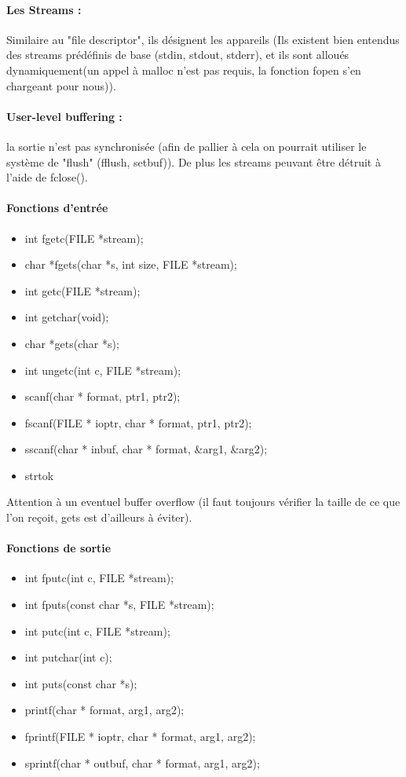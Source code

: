 \documentclass{article}[12pt]
\begin{document}
\paragraph{Les Streams : }
Similaire au "file descriptor", ils désignent les appareils (Ils existent bien entendus des streams prédéfinis de base (stdin, stdout, stderr), et ils sont alloués dynamiquement(un appel à malloc n'est pas requis, la fonction fopen s'en chargeant pour nous)).
\paragraph{User-level buffering : } la sortie n'est pas synchronisée (afin de pallier à cela on pourrait utiliser le système de "flush" (fflush, setbuf)). De plus les streams peuvant être détruit à l'aide de fclose().
\paragraph{Fonctions d'entrée}
\begin{itemize}
	\item int fgetc(FILE *stream);
	\item char *fgets(char *s, int size, FILE *stream);
	\item int getc(FILE *stream);
	\item int getchar(void);
	\item char *gets(char *s);
	\item int ungetc(int c, FILE *stream);
	\item scanf(char * format, ptr1, ptr2);
	\item fscanf(FILE * ioptr, char * format, ptr1, ptr2);
	\item sscanf(char * inbuf, char * format, \&arg1, \&arg2);
	\item strtok 
\end{itemize}   
Attention à un eventuel buffer overflow (il faut toujours vérifier la taille de ce que l'on reçoit, gets est d'ailleurs à éviter).
\paragraph{Fonctions de sortie}
\begin{itemize}
	\item int fputc(int c, FILE *stream);
	\item int fputs(const char *s, FILE *stream);
	\item int putc(int c, FILE *stream);
	\item int putchar(int c);
	\item int puts(const char *s);
	\item printf(char * format, arg1, arg2);
	\item fprintf(FILE * ioptr, char * format, arg1, arg2);
	\item sprintf(char * outbuf, char * format, arg1, arg2); 
\end{itemize}
\end{document}
